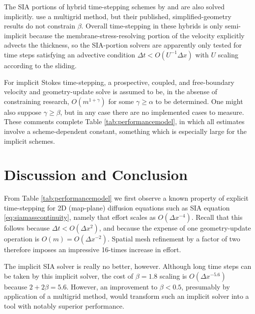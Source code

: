 \documentclass[twocolumn,letterpaper]{igs}
\begin{document}
The SIA portions of hybrid time-stepping schemes by \cite{JouvetGraeser2013} and \cite{BrinkerhoffJohnson2015} are also solved implicitly.  \cite{JouvetGraeser2013} use a multigrid method, but their published, simplified-geometry results do not constrain $\beta$.  Overall time-stepping in these hybrids is only semi-implicit because the membrane-stress-resolving portion of the velocity explicitly advects the thickness, so the SIA-portion solvers are apparently only tested for time steps satisfying an advective condition $\Delta t < O(U^{-1}\Delta x)$ with $U$ scaling according to the sliding.

For implicit Stokes time-stepping, a prospective, coupled, and free-boundary velocity and geometry-update solve is assumed to be, in the absense of constraining research, $O(m^{1+\gamma})$ for some $\gamma \ge \alpha$ to be determined.  One might also suppose $\gamma\ge \beta$, but in any case there are no implemented cases to measure.  These comments complete Table \ref{tab:performancemodel}, in which all estimates involve a scheme-dependent constant, something which is especially large for the implicit schemes.



\section{Discussion and Conclusion}

From Table \ref{tab:performancemodel} we first observe a known property of explicit time-stepping for 2D (map-plane) diffusion equations such as SIA equation \eqref{eq:siamasscontinuity}, namely that effort scales as $O(\Delta x^{-4})$.  Recall that this follows because $\Delta t < O(\Delta x^2)$, and because the expense of one geometry-update operation is $O(m) = O(\Delta x^{-2})$.  Spatial mesh refinement by a factor of two therefore imposes an impressive 16-times increase in effort.

The \cite{Bueler2016} implicit SIA solver is really no better, however.  Although long time steps can be taken by this implicit solver, the cost of $\beta=1.8$ scaling is $O(\Delta x^{-5.6})$ because $2+2\beta=5.6$.  However, an improvement to $\beta < 0.5$, presumably by application of a multigrid method, would transform such an implicit solver into a tool with notably superior performance.
\end{document}
